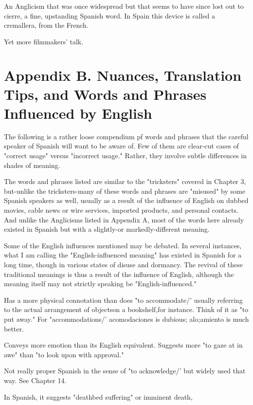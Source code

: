  An Anglicism that was once widespread but that
seems to have since lost out to cierre, a fine, upstanding Spanish
word. In Spain this device is called a cremallera, from the French.

 Yet more filmmakers' talk.

\chapter{Appendix B. Nuances, Translation Tips, and Words and Phrases Influenced by English}

The following is a rather loose compendium pf words and
phrases that the careful speaker of Spanish will want to be aware of.
Few of them are clear-cut cases of "correct usage" versus "incorrect usage." Rather, they involve subtle differences in shades of meaning.

The words and phrases listed are similar to the "tricksters"
covered in Chapter 3, but-unlike the tricksters-many of these words
and phrases are "misused" by some Spanish speakers as well, usually
as a result of the influence of English on dubbed movies, cable news
or wire services, imported products, and personal contacts. And unlike the Anglicisms listed in Appendix A, most of the words here already
existed in Spanish but with a slightly-or markedly-different meaning.

Some of the English influences mentioned may be debated. In
several instances, what I am calling the "English-influenced meaning"
has existed in Spanish for a long time, though in various states of disuse and dormancy. The revival of these traditional meanings is thus a
result of the influence of English, although the meaning itself may not
strictly speaking be "English-influenced."

\bsk

 Has a more physical connotation than does "to
accommodate/' usually referring to the actual arrangement of objectson a bookshelf,for instance. Think of it as "to put away." For "accommodations/' acomodaciones is dubious; alo;amiento is much better.

 Conveys more emotion than its English equivalent.
Suggests more "to gaze at in awe" than "to look upon with approval."

 Not really proper Spanish in the sense of "to acknowledge/' but widely used that way. See Chapter 14.

 In Spanish, it suggests "deathbed suffering" or imminent death,

